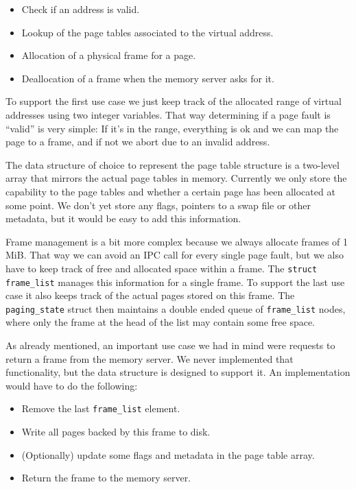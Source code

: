 \documentclass[a4paper,10pt]{article}
\begin{document}
\begin{itemize}
 \item Check if an address is valid.
 \item Lookup of the page tables associated to the virtual address.
 \item Allocation of a physical frame for a page.
 \item Deallocation of a frame when the memory server asks for it.
\end{itemize}

To support the first use case we just keep track of the allocated range of virtual addresses using two integer variables.
That way determining if a page fault is ``valid'' is very simple: 
If it's in the range, everything is ok and we can map the page to a frame, and if not we abort due to an invalid address.

The data structure of choice to represent the page table structure is a two-level array that mirrors the actual page tables in memory.
Currently we only store the capability to the page tables and whether a certain page has been allocated at some point.
We don't yet store any flags, pointers to a swap file or other metadata, but it would be easy to add this information.

Frame management is a bit more complex because we always allocate frames of 1 MiB.
That way we can avoid an IPC call for every single page fault, but we also have to keep track of free and allocated space within a frame.
The \lstinline!struct frame_list! manages this information for a single frame.
To support the last use case it also keeps track of the actual pages stored on this frame.
The \lstinline!paging_state! struct then maintains a double ended queue of \lstinline!frame_list! nodes, where only the frame at the head of the list may contain some free space.

As already mentioned, an important use case we had in mind were requests to return a frame from the memory server.
We never implemented that functionality, but the data structure is designed to support it.
An implementation would have to do the following:
\begin{itemize}
 \item Remove the last \lstinline!frame_list! element.
 \item Write all pages backed by this frame to disk.
 \item (Optionally) update some flags and metadata in the page table array.
 \item Return the frame to the memory server.
\end{itemize}
\end{document}

